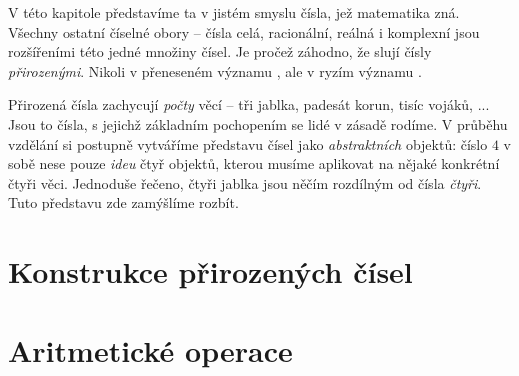 V této kapitole představíme ta v jistém smyslu  čísla, jež
matematika zná. Všechny ostatní číselné obory -- čísla celá, racionální, reálná
i komplexní jsou rozšířeními této jedné množiny čísel. Je pročež záhodno, že
slují čísly \emph{přirozenými}. Nikoli v přeneseném významu , ale v ryzím významu .

Přirozená čísla zachycují \emph{počty} věcí -- tři jablka, padesát korun, tisíc
vojáků, ... Jsou to čísla, s jejichž základním pochopením se lidé v zásadě
rodíme. V průběhu vzdělání si postupně vytváříme představu čísel jako
\emph{abstraktních} objektů: číslo $4$ v sobě nese pouze \emph{ideu} čtyř
objektů, kterou musíme aplikovat na nějaké konkrétní čtyři věci. Jednoduše
řečeno, čtyři jablka jsou něčím rozdílným od čísla \emph{čtyři}. Tuto představu
zde zamýšlíme rozbít.

\section{Konstrukce přirozených čísel}
\label{sec:konstrukce-prirozenych-cisel}



\section{Aritmetické operace}
\label{sec:aritmeticke-operace}


